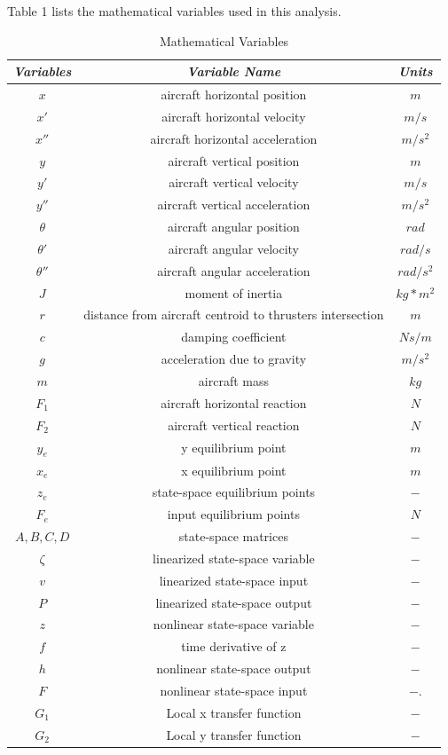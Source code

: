 \documentclass[conference]{IEEEtran}
\begin{document}
Table 1 lists the mathematical variables used in this analysis.
\begin{table}[htbp]
\begin{center}
\caption{Mathematical Variables}
\begin{tabular}{|c|c|c|}
\hline
\textbf{\textit{Variables}}& \textbf{\textit{Variable Name}}& \textbf{\textit{Units}} \\
\hline
$x$ & aircraft horizontal position & $m$ \\
\hline
$x'$ & aircraft horizontal velocity & $m/s$ \\
\hline
$x''$ & aircraft horizontal acceleration & $m/s^2$ \\
\hline
$y$ & aircraft vertical position & $m$ \\
\hline
$y'$ & aircraft vertical velocity & $m/s$ \\
\hline
$y''$ & aircraft vertical acceleration & $m/s^2$ \\
\hline
$\theta$ & aircraft angular position & $rad$ \\
\hline
$\theta'$ & aircraft angular velocity & $rad/s$ \\
\hline
$\theta''$ & aircraft  angular acceleration & $rad/s^2$ \\
\hline
$J$ & moment of inertia & $kg*m^2$ \\
\hline
$r$ & distance from aircraft centroid to thrusters intersection& $m$ \\
\hline
$c$ & damping coefficient & $Ns/m$ \\
\hline
$g$ & acceleration due to gravity  & $m/s^2$ \\
\hline
$m$ & aircraft mass & $kg$ \\
\hline
$F_1$ & aircraft horizontal reaction & $N$ \\
\hline
$F_2$ & aircraft vertical reaction & $N$ \\
\hline
$y_e$ & y equilibrium point & $m$ \\
\hline
$x_e$ & x equilibrium point & $m$ \\
\hline
$z_e$ & state-space equilibrium points & $-$ \\
\hline
$F_e$ & input equilibrium points & $N$ \\
\hline
$A,B,C,D$ & state-space matrices & $-$ \\
\hline
$\zeta$ & linearized state-space variable & $-$\\
\hline
$v$ & linearized state-space input & $-$\\
\hline
$P$ & linearized state-space output & $-$\\
\hline
$z$ & nonlinear state-space variable & $-$\\
\hline
$f$ & time derivative of z & $-$\\
\hline
$h$ & nonlinear state-space output & $-$\\
\hline
$F$ & nonlinear state-space input & $-$.\\
\hline
$G_1$ & Local x transfer function & $-$\\
\hline
$G_2$ & Local y transfer function & $-$\\
\hline
\end{tabular}
\end{center}
\end{table}
\end{document}
